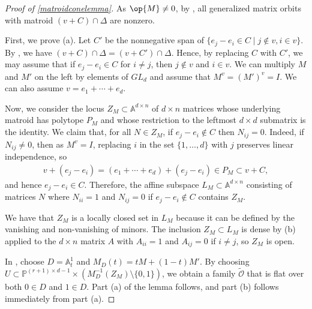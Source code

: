 \documentclass[12pt]{amsart}
\newcommand{\mb}{\mathbb}
\newcommand{\mc}{\mathcal}
\newcommand{\wt}{\widetilde}
\theoremstyle{plain}
\theoremstyle{definition}
\theoremstyle{remark}
\begin{document}
\begin{proof}[Proof of \cref{matroidconelemma}]
As $\op{M}\ne 0$, by , all generalized matrix orbits with matroid $(v+C)\cap \Delta$ are nonzero.

First, we prove (a). Let $C'$ be the nonnegative span of $\{e_j - e_i \in C \mid j \not \in v, i \in v\}$. By , we have $(v+C) \cap \Delta = (v+C') \cap \Delta$. Hence, by replacing $C$ with $C'$, we may assume that if $e_j - e_i \in C$ for $i \neq j$, then $j \not \in v$ and $i \in v$. We can multiply $M$ and $M'$ on the left by elements of $GL_d$ and assume that $M^v=(M')^v=I$. We can also assume $v=e_1+\cdots+e_{d}$. 

Now, we consider the locus $Z_M\subset \mb{A}^{d\times n}$ of $d\times n$ matrices whose underlying matroid has polytope $P_M$ and whose restriction to the leftmost $d\times d$ submatrix is the identity. We claim that, for all $N\in Z_M$, if $e_j-e_i\not \in C$ then $N_{ij}=0$. Indeed, if $N_{ij}\neq 0$, then as $M^v=I$, replacing $i$ in the set $\{1,\ldots, d\}$ with $j$ preserves linear independence, so 
\begin{align*}
v+(e_j-e_i)=(e_1+\cdots+e_d)+(e_j-e_i)\in P_M \subset v+C,
\end{align*}
and hence $e_j-e_i\in C$. Therefore, the affine subspace $L_M\subset \mb{A}^{d\times n}$ consisting of matrices $N$ where $N_{ii}=1$ and $N_{ij}=0$ if $e_j-e_i\notin C$ contains $Z_M$. 

We have that $Z_M$ is a locally closed set in $L_M$ because it can be defined by the vanishing and non-vanishing of minors. The inclusion $Z_M\subset L_M$ is dense by (b) applied to the $d \times n$ matrix $A$ with $A_{ii}=1$ and $A_{ij}=0$ if $i \ne j$, so $Z_M$ is open.

In , choose $D = \mb{A}^1_t$ and $M_D(t) = tM + (1-t)M'$. By choosing $U \subset \mb{P}^{(r+1)\times d - 1} \times (M_D^{-1}(Z_M)\setminus \{0, 1\})$, we obtain a family $\wt{\mc{O}}$ that is flat over both $0 \in D$ and $1 \in D$. Part (a) of the lemma follows, and part (b) follows immediately from part (a).
\end{proof}
\end{document}
